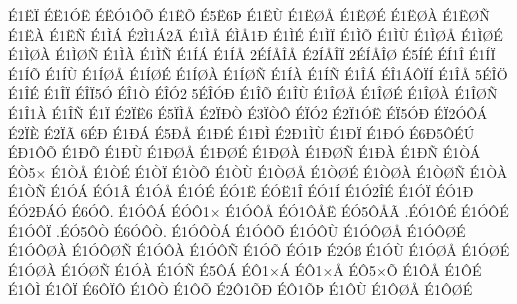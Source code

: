 {^^c91^^cb^^cf
^^c9^^cb1^^d3^^cb
^^c9^^cb^^d31^^d4^^d5
^^c91^^cb^^d5
^^c95^^cb6^^de
^^c91^^cb^^d9
^^c91^^cb^^d8^^c5
^^c91^^cb^^d8^^c9
^^c91^^cb^^d8^^c0
^^c91^^cb^^d8^^d1
^^c91^^cb^^c0
^^c91^^cb^^d1
^^c91^^cc^^c1
^^c92^^cc1^^c12^^c3
^^c91^^cc^^c5
^^c9^^cc^^c51^^d0
^^c91^^cc^^c9
^^c91^^cc^^cf
^^c91^^cc^^d5
^^c91^^cc^^d9
^^c91^^cc^^d8^^c5
^^c91^^cc^^d8^^c9
^^c91^^cc^^d8^^c0
^^c91^^cc^^d8^^d1
^^c91^^cc^^c0
^^c91^^cc^^d1
^^c91^^cd^^c1
^^c91^^cd^^c5
2^^c9^^cd^^c5^^ce^^c5
^^c92^^cd^^c5^^ce^^cf
2^^c9^^cd^^c5^^ce^^d8
^^c95^^cd^^c9
^^c9^^cd1^^ce
^^c91^^cd^^cf
^^c91^^cd^^d5
^^c91^^cd^^d9
^^c91^^cd^^d8^^c5
^^c91^^cd^^d8^^c9
^^c91^^cd^^d8^^c0
^^c91^^cd^^d8^^d1
^^c91^^cd^^c0
^^c91^^cd^^d1
^^c91^^ce^^c1
^^c9^^ce1^^c1^^d4^^cf^^cd
^^c91^^ce^^c5
5^^c9^^ce^^d6
^^c91^^ce^^c9
^^c91^^ce^^cf
^^c9^^ce^^cf5^^d3
^^c9^^ce1^^d2
^^c9^^ce^^d32
5^^c9^^ce^^d3^^d0
^^c91^^ce^^d5
^^c91^^ce^^d9
^^c91^^ce^^d8^^c5
^^c91^^ce^^d8^^c9
^^c91^^ce^^d8^^c0
^^c91^^ce^^d8^^d1
^^c91^^ce1^^c0
^^c91^^ce^^d1
^^c91^^cf
^^c92^^cf^^cb6
^^c95^^cf^^cc^^c5
^^c92^^cf^^d0^^d2
^^c93^^cf^^d2^^d4
^^c9^^cf^^d32
^^c92^^cf1^^d3^^cb
^^c9^^cf5^^d3^^d0
^^c9^^cf2^^d3^^d4^^c1
^^c92^^cf^^c8
^^c92^^cf^^c3
6^^c9^^d0
^^c91^^d0^^c1
^^c95^^d0^^c5
^^c91^^d0^^c9
^^c91^^d0^^cc
^^c92^^d01^^cc^^d9
^^c91^^d0^^cf
^^c91^^d0^^d3
^^c96^^d05^^d4^^c9^^da
^^c9^^d01^^d4^^d5
^^c91^^d0^^d5
^^c91^^d0^^d9
^^c91^^d0^^d8^^c5
^^c91^^d0^^d8^^c9
^^c91^^d0^^d8^^c0
^^c91^^d0^^d8^^d1
^^c91^^d0^^c0
^^c91^^d0^^d1
^^c91^^d2^^c1
^^c9^^d25^^d7
^^c91^^d2^^c5
^^c91^^d2^^c9
^^c91^^d2^^cf
^^c91^^d2^^d5
^^c91^^d2^^d9
^^c91^^d2^^d8^^c5
^^c91^^d2^^d8^^c9
^^c91^^d2^^d8^^c0
^^c91^^d2^^d8^^d1
^^c91^^d2^^c0
^^c91^^d2^^d1
^^c91^^d3^^c1
^^c9^^d31^^c2
^^c91^^d3^^c5
^^c91^^d3^^c9
^^c9^^d31^^cb
^^c9^^d3^^cb1^^ce
^^c9^^d31^^cd
^^c91^^d32^^ce^^c9
^^c91^^d3^^cf
^^c9^^d31^^d0
^^c9^^d32^^d0^^c1^^d3
^^c96^^d3^^d4.
^^c91^^d3^^d4^^c1
^^c9^^d3^^d41^^d7
^^c91^^d3^^d4^^c5
^^c9^^d31^^d4^^c5^^cb
^^c9^^d35^^d4^^c5^^c3
.^^c9^^d31^^d4^^c9
^^c91^^d3^^d4^^c9
^^c91^^d3^^d4^^cf
.^^c9^^d35^^d4^^d2
^^c96^^d3^^d4^^d2.
^^c91^^d3^^d4^^d2^^c1
^^c91^^d3^^d4^^d5
^^c91^^d3^^d4^^d9
^^c91^^d3^^d4^^d8^^c5
^^c91^^d3^^d4^^d8^^c9
^^c91^^d3^^d4^^d8^^c0
^^c91^^d3^^d4^^d8^^d1
^^c91^^d3^^d4^^c0
^^c91^^d3^^d4^^d1
^^c91^^d3^^d5
^^c9^^d31^^de
^^c92^^d3^^df
^^c91^^d3^^d9
^^c91^^d3^^d8^^c5
^^c91^^d3^^d8^^c9
^^c91^^d3^^d8^^c0
^^c91^^d3^^d8^^d1
^^c91^^d3^^c0
^^c91^^d3^^d1
^^c95^^d4^^c1
^^c9^^d41^^d7^^c1
^^c9^^d41^^d7^^c5
^^c9^^d45^^d7^^d5
^^c91^^d4^^c5
^^c91^^d4^^c9
^^c91^^d4^^cc
^^c91^^d4^^cf
^^c96^^d4^^cf^^d4
^^c91^^d4^^d2
^^c91^^d4^^d5
^^c92^^d41^^d5^^d0
^^c9^^d41^^d5^^de
^^c91^^d4^^d9
^^c91^^d4^^d8^^c5
^^c91^^d4^^d8^^c9
}
